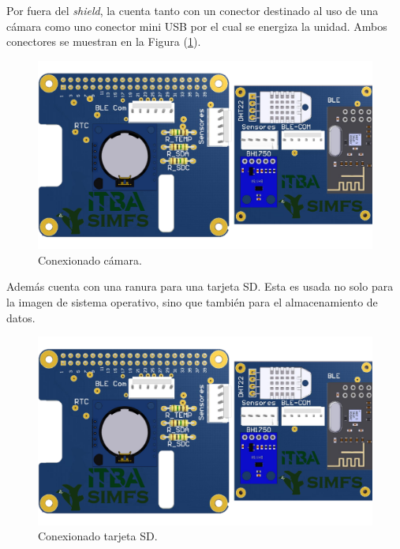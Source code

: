 Por fuera del \textit{shield}, la \rspi cuenta tanto con un conector destinado al uso de una cámara como uno conector mini USB por el cual se energiza la unidad. Ambos conectores se muestran en la Figura (\ref{fig:rpiFront}).
\begin{figure}[H]
	\centering
	\includegraphics[width=\linewidth,page=3]{ImagenesIngenieria de Detalle/RPI}		
	\caption{Conexionado cámara.}
	\label{fig:rpiFront}
\end{figure}

Además cuenta con una ranura para una tarjeta SD. Esta es usada no solo para la imagen de sistema operativo, sino que también para el almacenamiento de datos.
\begin{figure}[H]
	\centering
	\includegraphics[width=0.9\linewidth,page=2]{ImagenesIngenieria de Detalle/RPI}		
	\caption{Conexionado tarjeta SD.}
	\label{fig:rpiBack}
\end{figure}
